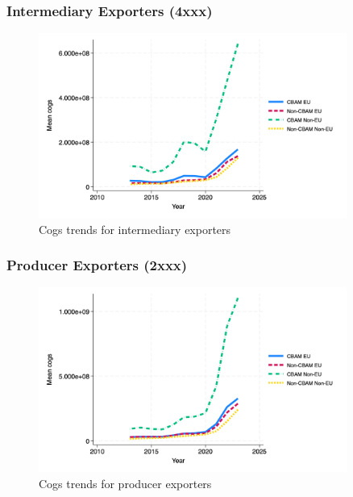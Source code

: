 \documentclass{article}
\begin{document}
\subsubsection{Intermediary Exporters (4xxx)}
\begin{figure}[h!]
\centering
\includegraphics[width=0.9\textwidth]{cogs_ei.png}
\caption{Cogs trends for intermediary exporters}
\label{fig:cogs_ei}
\end{figure}

\subsubsection{Producer Exporters (2xxx)}
\begin{figure}[h!]
\centering
\includegraphics[width=0.9\textwidth]{cogs_ep.png}
\caption{Cogs trends for producer exporters}
\label{fig:cogs_ep}
\end{figure}
\end{document}

